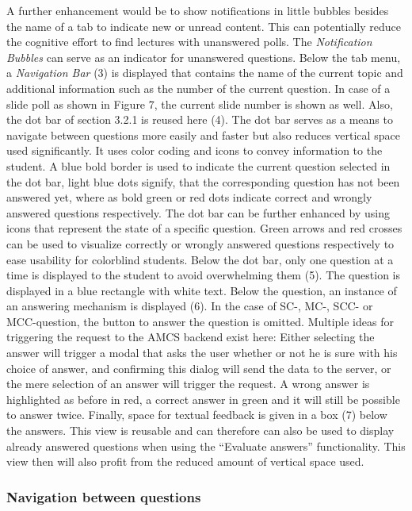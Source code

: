 A further enhancement would be to show notifications in little bubbles besides the name of a tab to indicate new or unread content. This can potentially reduce the cognitive effort to find lectures with unanswered polls. The \emph{Notification Bubbles} can serve as an indicator for unanswered questions.
Below the tab menu, a \emph{Navigation Bar} (3) is displayed that contains the name of the current topic and additional information such as the number of the current question. In case of a slide poll as shown in Figure 7, the current slide number is shown as well.
Also, the dot bar of section 3.2.1 is reused here (4). The dot bar serves as a means to navigate between questions more easily and faster but also reduces vertical space used significantly. It uses color coding and icons to convey information to the student. A blue bold border is used to indicate the current question selected in the dot bar, light blue dots signify, that the corresponding question has not been answered yet, where as bold green  or red dots indicate correct and wrongly answered questions respectively. The dot bar can be further enhanced by using icons that represent the state of a specific question. Green arrows and red crosses can be used to visualize correctly or wrongly answered questions respectively to ease usability for colorblind students. Below the dot bar, only one question at a time is displayed to the student to avoid overwhelming them (5). The question is displayed in a blue rectangle with white text. Below the question, an instance of an answering mechanism is displayed (6). In the case of SC-, MC-, SCC- or MCC-question, the button to answer the question is omitted. Multiple ideas for triggering the request to the AMCS backend exist here: Either selecting the answer will trigger a modal that asks the user whether or not he is sure with his choice of answer, and confirming this dialog will send the data to the server, or the mere selection of an answer will trigger the request.  A wrong answer is highlighted as before in red, a correct answer in green and it will still be possible to answer twice. Finally, space for textual feedback is given in a box (7) below the answers. This view is reusable and can therefore can also be used to display already answered questions when using the “Evaluate answers” functionality. This view then will also profit from the reduced amount of vertical space used. 

\subsubsection{Navigation between questions}

